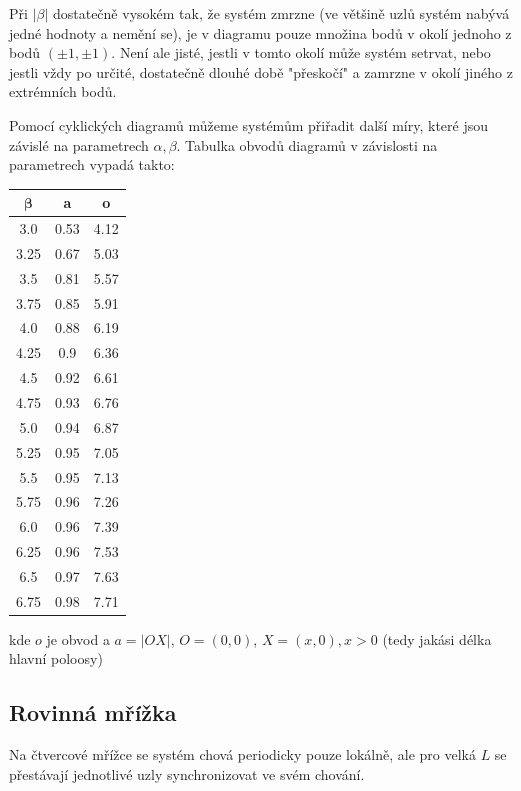 \documentclass{article}
\begin{document}
Při $|\beta|$ dostatečně vysokém tak, že systém zmrzne (ve většině uzlů systém nabývá jedné hodnoty a nemění se), je v diagramu pouze množina bodů v okolí jednoho z bodů $(\pm 1, \pm 1)$. Není ale jisté, jestli v tomto okolí může systém setrvat, nebo jestli vždy po určité, dostatečně dlouhé době "přeskočí" a zamrzne v okolí jiného z extrémních bodů.

Pomocí cyklických diagramů můžeme systémům přiřadit další míry, které jsou závislé na parametrech $\alpha, \beta$. Tabulka obvodů diagramů v závislosti na parametrech vypadá takto:

\begin{center}
\begin{tabular}{ c|c|c}
 $\boldsymbol{\beta}$ & \textbf{a} & \textbf{o}\\
\hline
3.0 & 0.53 & 4.12 \\
3.25 & 0.67 & 5.03 \\
3.5 & 0.81 & 5.57 \\
3.75 & 0.85 & 5.91 \\
4.0 & 0.88 & 6.19 \\
4.25 & 0.9 & 6.36 \\
4.5 & 0.92 & 6.61 \\
4.75 & 0.93 & 6.76 \\
5.0 & 0.94 & 6.87 \\
5.25 & 0.95 & 7.05 \\
5.5 & 0.95 & 7.13 \\
5.75 & 0.96 & 7.26 \\
6.0 & 0.96 & 7.39 \\
6.25 & 0.96 & 7.53 \\
6.5 & 0.97 & 7.63 \\
6.75 & 0.98 & 7.71 \\
\end{tabular}
\end{center}
kde $o$ je obvod a $a = |OX|$, $O = (0,0)$, $X = (x, 0), x > 0$ (tedy jakási délka hlavní poloosy)


\subsection{Rovinná mřížka}
Na čtvercové mřížce se systém chová periodicky pouze lokálně, ale pro velká $L$ se přestávají jednotlivé uzly synchronizovat ve svém chování. 
\end{document}
